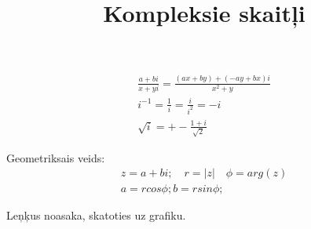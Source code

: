 \documentclass[12pt]{article}
\title{Kompleksie skaitļi}
\author{}
\date{}
\begin{document}
\maketitle

\begin{gather*}
	\frac{a+ bi}{x+ yi} = \frac{(ax+ by)+ (-ay+ bx)i}{x^2+ y} \\
	i^{-1} = \frac{1}{i} = \frac{i}{i^2} = -i \\ 
	\sqrt{i} = +- \frac{1+i}{\sqrt{2}}
\end{gather*}

Geometriksais veids:
\begin{gather*}
	 z=a+bi;  \quad  r=|z| \quad  \phi =arg(z) \\
	 a= r cos \phi; b= rsin \phi; 
\end{gather*}

Leņķus noasaka, skatoties uz grafiku.
\begin{gather*}
\end{gather*}

\begin{comment}
\end{comment}
\end{document}
